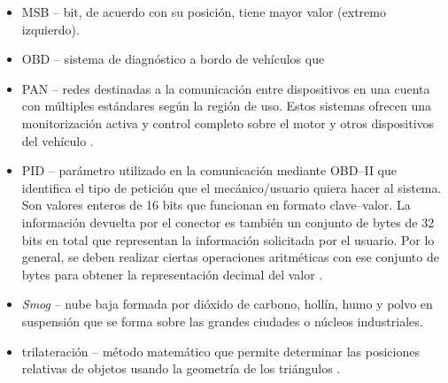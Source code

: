 \begin{itemize}
  \item \ac{MSB} -- bit, de acuerdo con su posición, tiene mayor valor (extremo izquierdo).
  \item \ac{OBD} -- sistema de diagnóstico a bordo de vehículos que
  \item \ac{PAN} -- redes destinadas a la comunicación entre dispositivos en una
        cuenta con múltiples estándares según la región de uso. Estos
        sistemas ofrecen una monitorización activa y control completo
        sobre el motor y otros dispositivos del vehículo \cite{OBD2021}.
  \item \ac{PID} -- parámetro utilizado en la comunicación mediante \ac{OBD}--II que
        identifica el tipo de petición que el mecánico/usuario quiera hacer al sistema.
        Son valores enteros de 16 bits que funcionan en formato clave--valor. La información
        devuelta por el conector es también un conjunto de bytes de 32 bits en total que
        representan la información solicitada por el usuario. Por lo general, se deben
        realizar ciertas operaciones aritméticas con ese conjunto de bytes para obtener
        la representación decimal del valor \cite{OBDIIPIDs2021}.
  \item \textit{Smog} -- nube baja formada por dióxido de carbono, hollín, humo y polvo
        en suspensión que se forma sobre las grandes ciudades o núcleos industriales.
  \item trilateración -- método matemático que permite determinar las posiciones
        relativas de objetos usando la geometría de los triángulos \cite{Trilateracion2021}.
\end{itemize}
